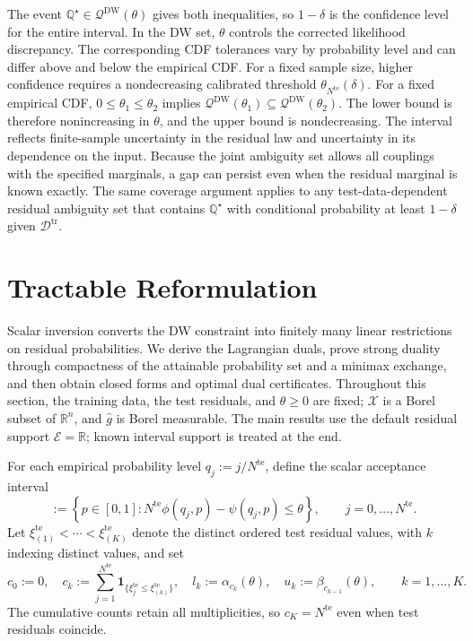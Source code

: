 \documentclass[review,11pt,3p,authoryear,nopreprintline]{elsarticle}
\begin{document}
The event $\mathbb Q^\star\in\mathcal Q^{\mathrm{DW}}(\theta)$ gives both inequalities, so $1-\delta$ is the confidence level for the entire interval. In the DW set, $\theta$ controls the corrected likelihood discrepancy. The corresponding CDF tolerances vary by probability level and can differ above and below the empirical CDF. For a fixed sample size, higher confidence requires a nondecreasing calibrated threshold $\theta_{N^{\mathrm{te}}}(\delta)$. For a fixed empirical CDF, $0\le\theta_1\le\theta_2$ implies $\mathcal Q^{\mathrm{DW}}(\theta_1)\subseteq\mathcal Q^{\mathrm{DW}}(\theta_2)$. The lower bound is therefore nonincreasing in $\theta$, and the upper bound is nondecreasing. The interval reflects finite-sample uncertainty in the residual law and uncertainty in its dependence on the input. Because the joint ambiguity set allows all couplings with the specified marginals, a gap can persist even when the residual marginal is known exactly. The same coverage argument applies to any test-data-dependent residual ambiguity set that contains $\mathbb Q^\star$ with conditional probability at least $1-\delta$ given $\mathcal D^{\mathrm{tr}}$.


\section{Tractable Reformulation}
\label{sec-reformulation}

Scalar inversion converts the DW constraint into finitely many linear restrictions on residual probabilities. We derive the Lagrangian duals, prove strong duality through compactness of the attainable probability set and a minimax exchange, and then obtain closed forms and optimal dual certificates. Throughout this section, the training data, the test residuals, and $\theta\ge0$ are fixed; $\mathcal X$ is a Borel subset of $\mathbb R^n$, and $\hat g$ is Borel measurable. The main results use the default residual support $\mathcal E=\mathbb R$; known interval support is treated at the end.

For each empirical probability level $q_j:=j/N^{\mathrm{te}}$, define the scalar acceptance interval
\begin{equation}
  [\alpha_j(\theta),\beta_j(\theta)]
  :=\left\{p\in[0,1]:
  N^{\mathrm{te}}\phi(q_j,p)-\psi(q_j,p)\le\theta\right\},
  \qquad j=0,\ldots,N^{\mathrm{te}}.
  \label{eq-dw-rank-acceptance}
\end{equation}
Let $\xi_{(1)}^{\mathrm{te}}<\cdots<\xi_{(K)}^{\mathrm{te}}$ denote the distinct ordered test residual values, with $k$ indexing distinct values, and set
\begin{equation} 
    c_0 :=0, \quad
    c_k :=\sum_{j=1}^{N^{\mathrm{te}}}\mathbf1_{\{\xi_j^{\mathrm{te}}\le\xi_{(k)}^{\mathrm{te}}\}}, \quad
    l_k :=\alpha_{c_k}(\theta),  \quad
    u_k :=\beta_{c_{k-1}}(\theta),\qquad k=1,\ldots,K. 
  \label{eq-dw-counts-and-levels}
\end{equation}
The cumulative counts retain all multiplicities, so $c_K=N^{\mathrm{te}}$ even when test residuals coincide.
\end{document}

